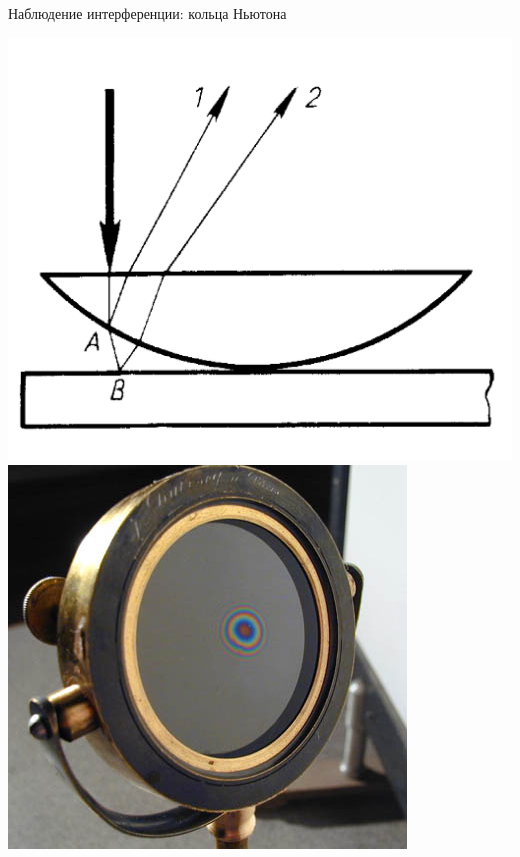 \documentclass[usenames,dvipsnames,pdftex,unicode,hidelinks]{beamer}
\begin{document}
  \begin{frame}{Наблюдение интерференции: кольца Ньютона}
    \begin{center}
      \includegraphics[height=0.5\textheight]{newton-rings-scheme}
      \includegraphics[height=0.5\textheight]{newton-rings}
    \end{center}
  \end{frame}
\end{document}
